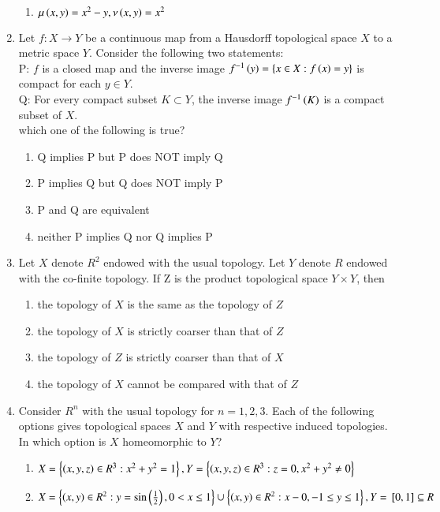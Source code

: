 \documentclass[journal]{IEEEtran}
\begin{document}
\begin{enumerate}
\begin{enumerate}
    \item $\mu\left(x,y\right)=x^2-y,\nu\left(x,y\right)=x^2$
\end{enumerate}
\item Let $f : X\rightarrow Y$ be a continuous map from a Hausdorff topological space $X$ to a metric space $Y$. Consider the following two statements:\\
  P: $f$ is a closed map and the inverse image $f^{-1}\left(y\right)=\left\{x\in X : f\left(x\right)=y\right\} $ is compact for each $y \in Y$.\\
  Q: For every compact subset $K \subset Y$, the inverse image $f^{-1}\left(K\right)$ is a compact subset of $X$.\\which one of the following is true?
  \begin{enumerate}
      \item Q implies P but P does NOT imply Q
      \item P implies Q but Q does NOT imply P
      \item P and Q are equivalent
      \item neither P implies Q nor Q implies P
  \end{enumerate}
\item Let $X$ denote $R^2$ endowed with the usual topology. Let $Y$ denote $R$ endowed with the co-finite topology. If Z is the product topological space $Y\times Y$, then 
\begin{enumerate}
    \item the topology of $X$ is the same as the topology of $Z$
    \item the topology of $X$ is strictly coarser  than that of $Z$
    \item the topology of $Z$ is strictly coarser  than that of $X$
    \item the topology of $X$ cannot be compared with that of $Z$
\end{enumerate}
\item Consider $R^n$ with the usual topology for $n=1,2,3$. Each of the following options gives topological spaces $X$ and $Y$ with respective induced topologies. In which option is $X$ homeomorphic to $Y$?
\begin{enumerate}
    \item $X=\left\{\left(x,y,z\right)\in R^3 : x^2+y^2=1\right\},Y=\left\{\left(x,y,z\right)\in R^3 : z=0, x^2+y^2 \neq 0\right\}$
    \item $X=\left\{\left(x,y\right)\in R^2 : y=\sin\left(\frac{1}{2}\right),0<x\le 1\right\}\cup \left\{\left(x,y\right)\in R^2: x-0,-1\le y \le 1\right\},Y={}\left[0,1\right]\subseteq R$

\end{enumerate}
\end{enumerate}
\end{document}
